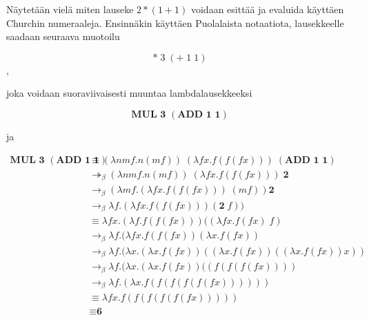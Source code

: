 \begin{esim}
Näytetään vielä miten lauseke $2 * (1+1)$ voidaan esittää ja evaluida käyttäen Churchin numeraaleja. Ensinnäkin käyttäen Puolalaista notaatiota, lausekkeelle saadaan seuraava muotoilu

\[* \; 3 \; (+ \; 1 \; 1) \], 

joka voidaan suoraviivaisesti muuntaa lambdalausekkeeksi

\[ \textbf{MUL 3 }(\textbf{ADD 1 1}) \]

ja 

\begin{align*}
\textbf{MUL 3 }(\textbf{ADD 1 1}) &\equiv (\lambda n m f . n (mf))  \; (\lambda f x . f(f(fx))) \;(\textbf{ADD 1 1}) \\
&\twoheadrightarrow_{\beta} (\lambda n m f . n (mf) ) \; (\lambda f x . f(f(fx))) \; \textbf{2} \\
&\rightarrow_{\beta} (\lambda m f . (\lambda f x . f(f(fx))) \; (m f)) \textbf{2}    \\
&\rightarrow_{\beta} \lambda f . (\lambda f x . f(f(fx))) (\textbf{2} \; f)) \\
&\equiv \lambda f x . (\lambda f . f(f(fx))) ((\lambda f x . f (f x) \; f) \\
&\rightarrow_{\beta} \lambda f . (\lambda f x .  f(f(fx)) (\lambda x . f (f x)) \\
&\rightarrow_{\beta} \lambda f . (\lambda x .  (\lambda x . f (f x))((\lambda x . f (f x))((\lambda x . f (f x))x))\\
&\rightarrow_{\beta} \lambda f . (\lambda x .  (\lambda x . f (f x))((f (f( f( f x))))  \\
&\rightarrow_{\beta} \lambda f . (\lambda x . f( f (f (f( f( f x)))))) \\
&\equiv \lambda f x. f( f (f (f( f( f x))))) \\
&\equiv \textbf{6}
\end{align*}
 
 
 
\end{esim}   
   